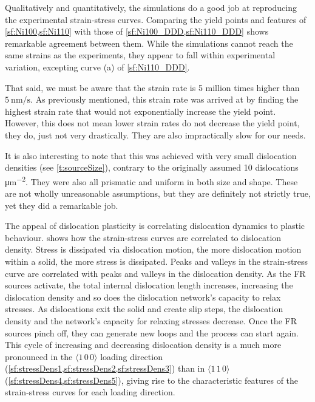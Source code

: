 Qualitatively and quantitatively, the simulations do a good job at reproducing the experimental strain-stress curves. Comparing the yield points and features of \cref{sf:Ni100,sf:Ni110} with those of \cref{sf:Ni100_DDD,sf:Ni110_DDD} shows remarkable agreement between them. While the simulations cannot reach the same strains as the experiments, they appear to fall within experimental variation, excepting curve (a) of \cref{sf:Ni110_DDD}.

That said, we must be aware that the strain rate is 5 million times higher than $\SI{5}{\nano\meter\per\second}$. As previously mentioned, this strain rate was arrived at by finding the highest strain rate that would not exponentially increase the yield point. However, this does not mean lower strain rates do not decrease the yield point, they do, just not very drastically. They are also impractically slow for our needs.

It is also interesting to note that this was achieved with very small dislocation densities (see \cref{t:sourceSize}), contrary to the originally assumed 10 dislocations \si{\micro\metre^{-2}}. They were also all prismatic and uniform in both size and shape. These are not wholly unreasonable assumptions, but they are definitely not strictly true, yet they did a remarkable job.

The appeal of dislocation plasticity is correlating dislocation dynamics to plastic behaviour.  shows how the strain-stress curves are correlated to dislocation density. Stress is dissipated via dislocation motion, the more dislocation motion within a solid, the more stress is dissipated. Peaks and valleys in the strain-stress curve are correlated with peaks and valleys in the dislocation density. As the FR sources activate, the total internal dislocation length increases, increasing the dislocation density and so does the dislocation network's capacity to relax stresses. As dislocations exit the solid and create slip steps, the dislocation density and the network's capacity for relaxing stresses decrease. Once the FR sources pinch off, they can generate new loops and the process can start again. This cycle of increasing and decreasing dislocation density is a much more pronounced in the $\langle 1\, 0\, 0 \rangle$ loading direction (\cref{sf:stressDens1,sf:stressDens2,sf:stressDens3}) than in $\langle 1\, 1\, 0\rangle$ (\cref{sf:stressDens4,sf:stressDens5}), giving rise to the characteristic features of the strain-stress curves for each loading direction.

